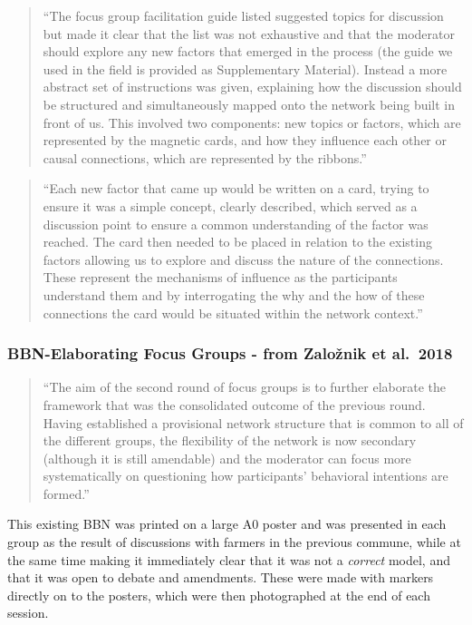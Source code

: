 \documentclass[]{article}
\begin{document}
\begin{quote}
``The focus group facilitation guide listed suggested topics for
discussion but made it clear that the list was not exhaustive and that
the moderator should explore any new factors that emerged in the process
(the guide we used in the field is provided as Supplementary Material).
Instead a more abstract set of instructions was given, explaining how
the discussion should be structured and simultaneously mapped onto the
network being built in front of us. This involved two components: new
topics or factors, which are represented by the magnetic cards, and how
they influence each other or causal connections, which are represented
by the ribbons.''
\end{quote}

\begin{quote}
``Each new factor that came up would be written on a card, trying to
ensure it was a simple concept, clearly described, which served as a
discussion point to ensure a common understanding of the factor was
reached. The card then needed to be placed in relation to the existing
factors allowing us to explore and discuss the nature of the
connections. These represent the mechanisms of influence as the
participants understand them and by interrogating the why and the how of
these connections the card would be situated within the network
context.''
\end{quote}

\hypertarget{bbn-elaborating-focus-groups---from-zaloznik-et-al.-2018}{%
\subsubsection{BBN-Elaborating Focus Groups - from Založnik et
al.~2018}\label{bbn-elaborating-focus-groups---from-zaloznik-et-al.-2018}}

\begin{quote}
``The aim of the second round of focus groups is to further elaborate
the framework that was the consolidated outcome of the previous round.
Having established a provisional network structure that is common to all
of the different groups, the flexibility of the network is now secondary
(although it is still amendable) and the moderator can focus more
systematically on questioning how participants' behavioral intentions
are formed.''
\end{quote}

This existing BBN was printed on a large A0 poster and was presented in
each group as the result of discussions with farmers in the previous
commune, while at the same time making it immediately clear that it was
not a \emph{correct} model, and that it was open to debate and
amendments. These were made with markers directly on to the posters,
which were then photographed at the end of each session.
\end{document}
